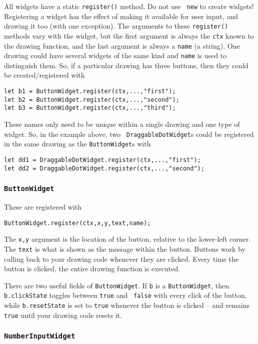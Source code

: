\documentclass[10pt]{article}
\begin{document}
All widgets have a static {\tt register()} method. Do not use {\tt
  new} to create widgets! Registering a widget has the effect of
making it available for user input, and drawing it too (with one
exception). The arguments to these {\tt register()} methods vary with
the widget, but the first argument is always the {\tt ctx} known to
the drawing function, and the last argument is always a {\tt name} (a
string). One drawing could have several widgets of the same kind and
{\tt name} is used to distinguish 
them. So, if a particular drawing has three buttons, then they could
be created/registered with
\begin{verbatim}
let b1 = ButtonWidget.register(ctx,...,"first");
let b2 = ButtonWidget.register(ctx,...,"second");
let b3 = ButtonWidget.register(ctx,...,"third");
\end{verbatim}
These names only need to be unique within a single drawing and one
type of widget. So, in the example above, two {\tt
  DraggableDotWidget}s could be registered in the same drawing as
the {\tt ButtonWidget}s with
\begin{verbatim}
let dd1 = DraggableDotWidget.register(ctx,...,"first");
let dd2 = DraggableDotWidget.register(ctx,...,"second");
\end{verbatim}

\subsubsection{\tt ButtonWidget}

These are registered with 
\begin{verbatim}
ButtonWidget.register(ctx,x,y,text,name);
\end{verbatim}
The {\tt x,y} argument is the location of the button, relative to the
lower-left corner. The {\tt text} is what is shown as the message
within the button. Buttons work by calling back to your drawing code
whenever they are clicked. Every time the button is clicked, the
entire drawing function is executed.

There are two useful fields of {\tt ButtonWidget}. If {\tt b} is a
{\tt ButtonWidget}, then {\tt b.clickState} toggles between {\tt true} and {\tt
  false} with every click of the button, while {\tt b.resetState} is
set to {\tt true} whenever the button is clicked -- and remains {\tt
  true} until your drawing code resets it.

\subsubsection{\tt NumberInputWidget}
\end{document}
